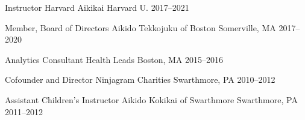 


\begin{cventries}

  \cventry
    {Instructor} %
    {Harvard Aikikai} %
    {Harvard U.} %
    {2017--2021} %
    {}

\cventry
    {Member, Board of Directors} %
    {Aikido Tekkojuku of Boston} %
    {Somerville, MA} %
    {2017--2020} %
    {}

\cventry
    {Analytics Consultant} %
    {Health Leads} %
    {Boston, MA} %
    {2015--2016} %
    {}

\cventry
    {Cofounder and Director} %
    {Ninjagram Charities} %
    {Swarthmore, PA} %
    {2010--2012} %
    {}

\cventry
    {Assistant Children's Instructor} %
    {Aikido Kokikai of Swarthmore} %
    {Swarthmore, PA} %
    {2011--2012} %
    {}
\end{cventries}